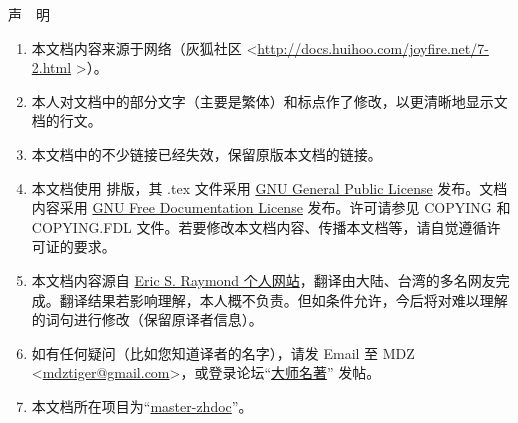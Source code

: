 \centerline{\LARGE 声\,\,\,\,\,\,明}

\baselineskip

\large
\begin{enumerate}
\item 本文档内容来源于网络（灰狐社区 <\url{http://docs.huihoo.com/joyfire.net/7-2.html} >）。
\item 本人对文档中的部分文字（主要是繁体）和标点作了修改，以更清晰地显示文档的行文。
\item 本文档中的不少链接已经失效，保留原版本文档的链接。
\item 本文档使用 \XeLaTeX{} 排版，其 .tex 文件采用 \href{http://www.gnu.org/copyleft/gpl.html}{GNU General Public License} 发布。文档内容采用 \href{http://www.gnu.org/copyleft/fdl.html}{GNU Free Documentation License} 发布。许可请参见 COPYING 和 COPYING.FDL 文件。若要修改本文档内容、传播本文档等，请自觉遵循许可证的要求。
\item 本文档内容源自 \href{http://www.catb.org/~esr/}{Eric S. Raymond 个人网站}，翻译由大陆、台湾的多名网友完成。翻译结果若影响理解，本人概不负责。但如条件允许，今后将对难以理解的词句进行修改（保留原译者信息）。
\item 如有任何疑问（比如您知道译者的名字），请发 Email 至 MDZ <\href{mailto:mdztiger@gmail.com}{mdztiger@gmail.com}>，或登录论坛“\href{http://groups.google.com/group/master-zhdoc?hl=zh-CN}{大师名著}” 发帖。
\item 本文档所在项目为“\href{http://code.google.com/p/master-zhdoc/}{master-zhdoc}”。
\end{enumerate}

\normalsize

